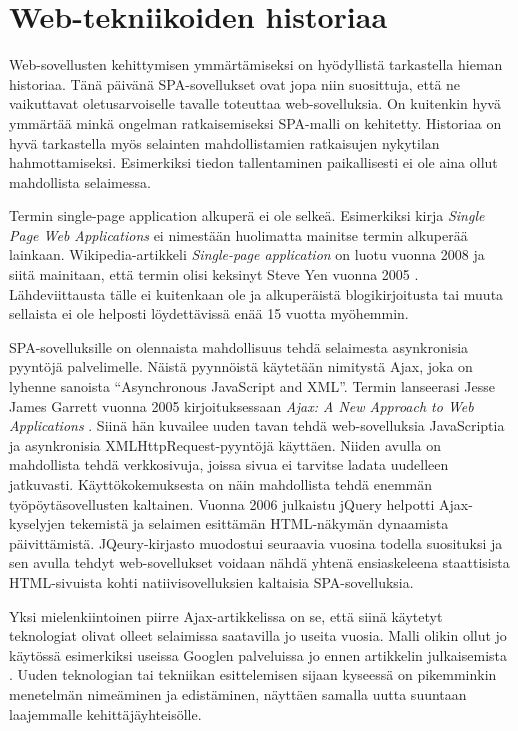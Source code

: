 \documentclass[finnish,twoside,censored,csm,sw-track-2018]{HYthesisML}
\begin{document}
\chapter{Web-tekniikoiden historiaa}
\label{web-history}

Web-sovellusten kehittymisen ymmärtämiseksi on hyödyllistä tarkastella hieman historiaa. Tänä päivänä SPA-sovellukset ovat jopa niin suosittuja, että ne vaikuttavat oletusarvoiselle tavalle toteuttaa web-sovelluksia. On kuitenkin hyvä ymmärtää minkä ongelman ratkaisemiseksi SPA-malli on kehitetty. Historiaa on hyvä tarkastella myös selainten mahdollistamien ratkaisujen nykytilan hahmottamiseksi. Esimerkiksi tiedon tallentaminen paikallisesti ei ole aina ollut mahdollista selaimessa.

Termin single-page application alkuperä ei ole selkeä. Esimerkiksi kirja \textit{Single  Page  Web  Applications} \citep{Mikowski} ei nimestään huolimatta mainitse termin alkuperää lainkaan. Wikipedia-artikkeli \textit{Single-page application} on luotu vuonna 2008 ja siitä mainitaan, että termin olisi keksinyt Steve Yen vuonna 2005 \citep{wikiSPA-2008}. Lähdeviittausta tälle ei kuitenkaan ole ja alkuperäistä blogikirjoitusta tai muuta sellaista ei ole helposti löydettävissä enää 15 vuotta myöhemmin.

SPA-sovelluksille on olennaista mahdollisuus tehdä selaimesta asynkronisia pyyntöjä palvelimelle. Näistä pyynnöistä käytetään nimitystä Ajax, joka on lyhenne sanoista ``Asynchronous JavaScript and XML''. Termin lanseerasi Jesse James Garrett vuonna 2005 kirjoituksessaan \textit{Ajax: A New Approach to Web Applications} \citep{Ajax}. Siinä hän kuvailee uuden tavan tehdä web-sovelluksia JavaScriptia ja asynkronisia XMLHttpRequest-pyyntöjä käyttäen. Niiden avulla on mahdollista tehdä verkkosivuja, joissa sivua ei tarvitse ladata uudelleen jatkuvasti. Käyttökokemuksesta on näin mahdollista tehdä enemmän työpöytäsovellusten kaltainen. Vuonna 2006 julkaistu jQuery \cite{JSdefguide} helpotti Ajax-kyselyjen tekemistä ja selaimen esittämän HTML-näkymän dynaamista päivittämistä. JQeury-kirjasto muodostui seuraavia vuosina todella suosituksi ja sen avulla tehdyt web-sovellukset voidaan nähdä yhtenä ensiaskeleena staattisista HTML-sivuista kohti natiivisovelluksien kaltaisia SPA-sovelluksia.

Yksi mielenkiintoinen piirre Ajax-artikkelissa on se, että siinä käytetyt teknologiat olivat olleet selaimissa saatavilla jo useita vuosia. Malli olikin ollut jo käytössä esimerkiksi useissa Googlen palveluissa jo ennen artikkelin julkaisemista \citep{Ajax}. Uuden teknologian tai tekniikan esittelemisen sijaan kyseessä on pikemminkin menetelmän nimeäminen ja edistäminen, näyttäen samalla uutta suuntaan laajemmalle kehittäjäyhteisölle.
\end{document}
